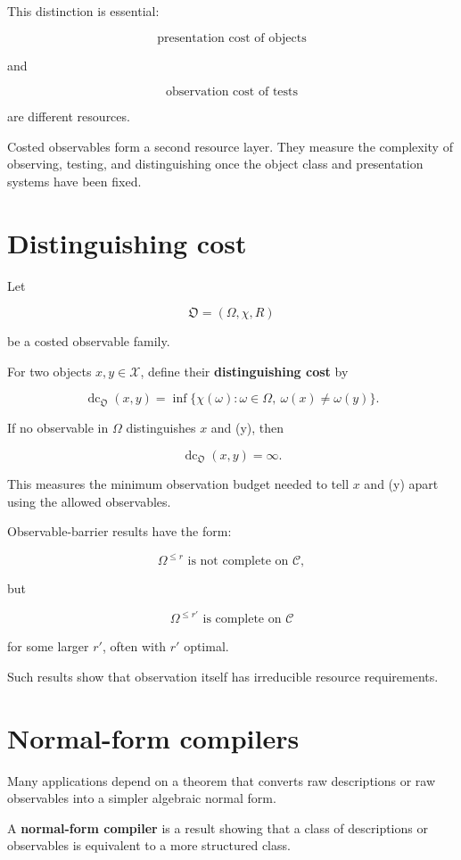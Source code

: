 \documentclass[11pt]{article}
\begin{document}
This distinction is essential:

\[
\text{presentation cost of objects}
\]

and

\[
\text{observation cost of tests}
\]

are different resources.

Costed observables form a second resource layer. They measure the complexity of observing, testing, and distinguishing once the object class and presentation systems have been fixed.


\section{Distinguishing cost}

Let

\[
\mathfrak O=(\Omega,\chi,R)
\]

be a costed observable family.

For two objects \(x,y\in\mathcal X\), define their \textbf{distinguishing cost} by

\[
\operatorname{dc}_{\mathfrak O}(x,y)=\inf\{\chi(\omega):\omega\in\Omega,\ \omega(x)\neq\omega(y)\}.
\]

If no observable in \(\Omega\) distinguishes \(x\) and (y), then

\[
\operatorname{dc}_{\mathfrak O}(x,y)=\infty.
\]

This measures the minimum observation budget needed to tell \(x\) and (y) apart using the allowed observables.

Observable-barrier results have the form:

\[
\Omega^{\leq r}\text{ is not complete on }\mathcal C,
\]

but

\[
\Omega^{\leq r'}\text{ is complete on }\mathcal C
\]

for some larger \(r'\), often with \(r'\) optimal.

Such results show that observation itself has irreducible resource requirements.


\section{Normal-form compilers}

Many applications depend on a theorem that converts raw descriptions or raw observables into a simpler algebraic normal form.

A \textbf{normal-form compiler} is a result showing that a class of descriptions or observables is equivalent to a more structured class.
\end{document}
